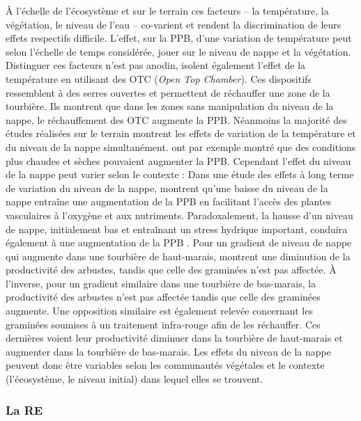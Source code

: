 À l'échelle de l'écosystème et sur le terrain ces facteurs -- la température, la végétation, le niveau de l'eau -- co-varient et rendent la discrimination de leurs effets respectifs difficile.
L'effet, sur la PPB, d'une variation de température peut selon l'échelle de temps considérée, jouer sur le niveau de nappe et la végétation.
Distinguer ces facteurs n'est pas anodin, \citet{munir2015} isolent également l'effet de la température en utilisant des OTC (\textit{Open Top Chamber}).
Ces dispositifs ressemblent à des serres ouvertes et permettent de réchauffer une zone de la tourbière.
Ils montrent que dans les zones sans manipulation du niveau de la nappe, le réchauffement des OTC augmente la PPB.
Néanmoins la majorité des études réalisées sur le terrain montrent les effets de variation de la température et du niveau de la nappe simultanément.
\citet{cai2010} ont par exemple montré que des conditions plus chaudes et sèches pouvaient augmenter la PPB.
Cependant l'effet du niveau de la nappe peut varier selon le contexte : Dans une étude des effets à long terme de variation du niveau de la nappe, \citet{ballantyne2014} montrent qu'une baisse du niveau de la nappe entraîne une augmentation de la PPB en facilitant l'accès des plantes vasculaires à l'oxygène et aux nutriments.
Paradoxalement, la hausse d'un niveau de nappe, initialement bas et entraînant un stress hydrique important, conduira également à une augmentation de la PPB \citep{strack2013}.
Pour un gradient de niveau de nappe qui augmente dans une tourbière de haut-marais, \citet{weltzin2000} montrent une diminution de la productivité des arbustes, tandis que celle des graminées n'est pas affectée.
À l'inverse, pour un gradient similaire dans une tourbière de bas-marais, la productivité des arbustes n'est pas affectée tandis que celle des graminées augmente.
Une opposition similaire est également relevée concernant les graminées soumises à un traitement infra-rouge afin de les réchauffer.
Ces dernières voient leur productivité diminuer dans la tourbière de haut-marais et augmenter dans la tourbière de bas-marais.
Les effets du niveau de la nappe peuvent donc être variables selon les communautés végétales et le contexte (l'écosystème, le niveau initial) dans lequel elles se trouvent.

\subsubsection{La RE}


